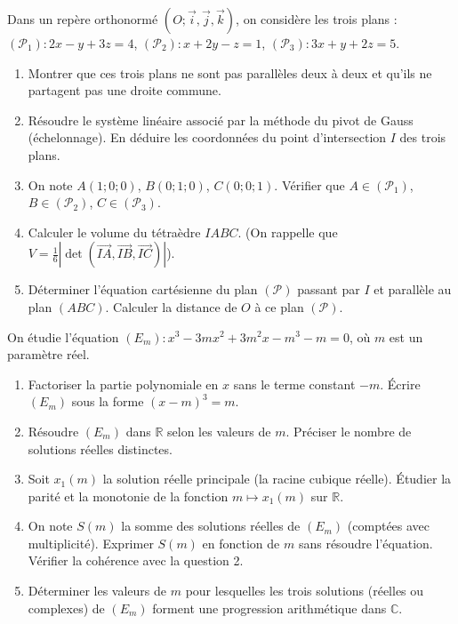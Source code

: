 \documentclass[11pt]{article}
\begin{document}
\begin{exercice}
Dans un repère orthonormé $(O; \vec{i}, \vec{j}, \vec{k})$, on considère les trois plans :
$(\mathcal{P}_1) : 2x - y + 3z = 4$, $(\mathcal{P}_2) : x + 2y - z = 1$, $(\mathcal{P}_3) : 3x + y + 2z = 5$.
\begin{enumerate}
    \item Montrer que ces trois plans ne sont pas parallèles deux à deux et qu'ils ne partagent pas une droite commune.
    \item Résoudre le système linéaire associé par la méthode du pivot de Gauss (échelonnage). En déduire les coordonnées du point d'intersection $I$ des trois plans.
    \item On note $A(1;0;0)$, $B(0;1;0)$, $C(0;0;1)$. Vérifier que $A \in (\mathcal{P}_1)$, $B \in (\mathcal{P}_2)$, $C \in (\mathcal{P}_3)$.
    \item Calculer le volume du tétraèdre $IABC$. (On rappelle que $V = \frac{1}{6} | \det(\overrightarrow{IA}, \overrightarrow{IB}, \overrightarrow{IC}) |$).
    \item Déterminer l'équation cartésienne du plan $(\mathcal{P})$ passant par $I$ et parallèle au plan $(ABC)$. Calculer la distance de $O$ à ce plan $(\mathcal{P})$.
\end{enumerate}
\end{exercice}

\begin{exercice}
On étudie l'équation $(E_m) : x^3 - 3mx^2 + 3m^2x - m^3 - m = 0$, où $m$ est un paramètre réel.
\begin{enumerate}
    \item Factoriser la partie polynomiale en $x$ sans le terme constant $-m$. Écrire $(E_m)$ sous la forme $(x-m)^3 = m$.
    \item Résoudre $(E_m)$ dans $\mathbb{R}$ selon les valeurs de $m$. Préciser le nombre de solutions réelles distinctes.
    \item Soit $x_1(m)$ la solution réelle principale (la racine cubique réelle). Étudier la parité et la monotonie de la fonction $m \mapsto x_1(m)$ sur $\mathbb{R}$.
    \item On note $S(m)$ la somme des solutions réelles de $(E_m)$ (comptées avec multiplicité). Exprimer $S(m)$ en fonction de $m$ sans résoudre l'équation. Vérifier la cohérence avec la question 2.
    \item Déterminer les valeurs de $m$ pour lesquelles les trois solutions (réelles ou complexes) de $(E_m)$ forment une progression arithmétique dans $\mathbb{C}$.
\end{enumerate}
\end{exercice}
\end{document}
